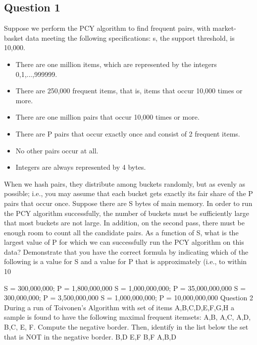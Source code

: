 \subsection*{Question 1}
Suppose we perform the PCY algorithm to find frequent pairs, with market-basket data meeting the following specifications:
s, the support threshold, is 10,000.
\begin{itemize}
\item There are one million items, which are represented by the integers 0,1,...,999999.
\item There are 250,000 frequent items, that is, items that occur 10,000 times or more.
\item There are one million pairs that occur 10,000 times or more.
\item There are P pairs that occur exactly once and consist of 2 frequent items.
\item No other pairs occur at all.
\item Integers are always represented by 4 bytes.
\end{itemize}
When we hash pairs, they distribute among buckets randomly, but as evenly as possible; i.e., you may assume that each bucket gets exactly its fair share of the P pairs that occur once.
Suppose there are S bytes of main memory. In order to run the PCY algorithm successfully, the number of buckets must be sufficiently large that most buckets are not large. In addition, on the second pass, there must be enough room to count all the candidate pairs. As a function of S, what is the largest value of P for which we can successfully run the PCY algorithm on this data? Demonstrate that you have the correct formula by indicating which of the following is a value for S and a value for P that is approximately (i.e., to within 10%

S = 300,000,000; P = 1,800,000,000
S = 1,000,000,000; P = 35,000,000,000
S = 300,000,000; P = 3,500,000,000
S = 1,000,000,000; P = 10,000,000,000
Question 2
During a run of Toivonen's Algorithm with set of items {A,B,C,D,E,F,G,H} a sample is found to have the following maximal frequent itemsets: {A,B}, {A,C}, {A,D}, {B,C}, {E}, {F}. Compute the negative border. Then, identify in the list below the set that is NOT in the negative border.
{B,D}
{E,F}
{B,F}
{A,B,D}

